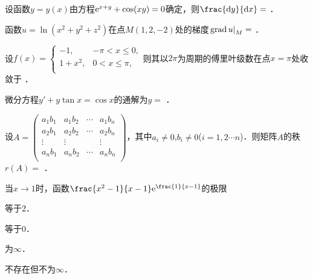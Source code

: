 \documentclass[plain,noanswer,medmath]{../../template/jnuexam}
\begin{document}




\begin{problem}
设函数$y = y(x)$由方程$\mathrm{e}^{x + y} + \cos(xy) = 0$确定，则$\frac{\dy}{\dx} =$ \fillin{}．
\end{problem}


\begin{problem}
函数$u = \ln(x^2 + y^2 + z^2)$在点$M(1,2, -2)$处的梯度$\left.\operatorname{grad} u\right|_M =$ \fillin{}．
\end{problem}


\begin{problem}
设$f(x) = \begin{cases}
      -1, & - \pi < x \le 0, \\
 1 + x^2, & 0 < x \le \pi , \\
\end{cases}$则其以$2\pi$为周期的傅里叶级数在点$x = \pi$处收敛于 \fillin{}．
\end{problem}


\begin{problem}
微分方程$y' + y\tan x = \cos x$的通解为$y =$ \fillin{}．
\end{problem}


\begin{problem}
设$A = \begin{pmatrix}
  a_1b_1 & a_1b_2 & \cdots & a_1b_n \\
  a_2b_1 & a_2b_2 & \cdots & a_2b_n \\
 \vdots & \vdots &        & \vdots \\
  a_nb_1 & a_nb_2 & \cdots & a_nb_n \\
\end{pmatrix}$，其中$a_i \ne 0$,$b_i \ne 0$($i = 1,2 \cdots n$)．则矩阵$A$的秩$r(A)=$ \fillin{}．
\end{problem}




\begin{problem}
当$x \to 1$时，函数$\frac{x^2 - 1}{x - 1}\e^{\frac{1}{x - 1}}$的极限 \pickout{}
\begin{abcd}
\item 等于$2$．     
\item 等于$0$．     
\item 为$\infty$．     
\item 不存在但不为$\infty$．
\end{abcd}
\end{problem}
\end{document}
